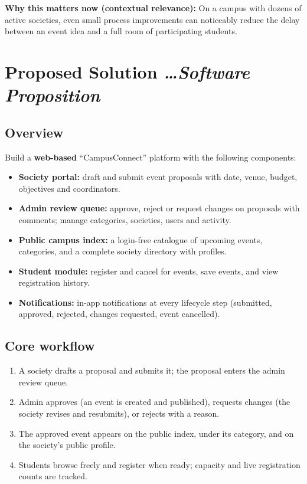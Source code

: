 \documentclass[11pt,a4paper]{article}
\newcommand{\BvrHint}[1]{%
  {\normalfont\normalsize\itshape\hfill #1}}
\begin{document}
\textbf{Why this matters now (contextual relevance):} On
a campus with dozens of active societies, even small
process improvements can noticeably reduce the delay
between an event idea and a full room of participating
students.

\section{Proposed Solution %
\BvrHint{\ldots Software Proposition}}
\subsection{Overview}
Build a \textbf{web-based} ``CampusConnect'' platform with
the following components:
\begin{itemize}[leftmargin=0.7cm]
    \item \textbf{Society portal:} draft and submit event
      proposals with date, venue, budget, objectives and
      coordinators.
    \item \textbf{Admin review queue:} approve, reject or
      request changes on proposals with comments;
      manage categories, societies, users and activity.
    \item \textbf{Public campus index:} a login-free
      catalogue of upcoming events, categories, and a
      complete society directory with profiles.
    \item \textbf{Student module:} register and cancel
      for events, save events, and view registration
      history.
    \item \textbf{Notifications:} in-app notifications at
      every lifecycle step (submitted, approved,
      rejected, changes requested, event cancelled).
\end{itemize}

\subsection{Core workflow}
\begin{enumerate}[leftmargin=0.7cm]
    \item A society drafts a proposal and submits it;
      the proposal enters the admin review queue.
    \item Admin approves (an event is created and
      published), requests changes (the society revises
      and resubmits), or rejects with a reason.
    \item The approved event appears on the public index,
      under its category, and on the society's public
      profile.
    \item Students browse freely and register when ready;
      capacity and live registration counts are tracked.
\end{enumerate}
\end{document}
